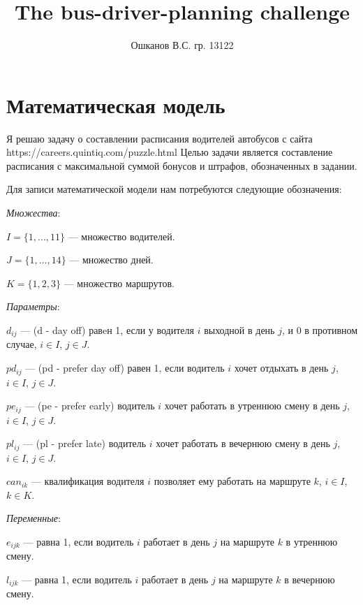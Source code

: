 \documentclass[]{article}
\title{The bus-driver-planning challenge}
\author{Ошканов В.С. гр. 13122}
\begin{document}
\maketitle
\section{Математическая модель}

Я решаю задачу о составлении расписания водителей автобусов с
сайта https://careers.quintiq.com/puzzle.html
Целью задачи является составление расписания с максимальной
суммой бонусов и штрафов, обозначенных в задании.

Для записи математической модели нам потребуются следующие обозначения:
\par
\textit{Множества}:
\par\noindent
$I = \{1,...,11\}$ --- множество водителей.
\par\noindent
$J = \{1,...,14\}$ --- множество дней.
\par\noindent
$K = \{1,2,3\}$ --- множество маршрутов.
\par
\textit{Параметры}:
\par\noindent
$d_{ij}$ --- (d - day off) равeн 1, если у водителя $i$ выходной в день $j$, и 0
в противном случае, $i\in I$, $j\in J$.
\par\noindent
$pd_{ij}$ --- (pd - prefer day off) равен 1, если водитель $i$ хочет отдыхать в
день $j$, $i\in I$, $j\in J$.
\par\noindent
$pe_{ij}$ --- (pe - prefer early) водитель $i$ хочет работать в утреннюю
смену в день $j$, $i\in I$, $j\in J$.
\par\noindent
$pl_{ij}$ --- (pl - prefer late) водитель $i$ хочет работать в вечернюю
смену в день $j$, $i\in I$, $j\in J$.
\par\noindent
$can_{ik}$ --- квалификация водителя $i$ позволяет ему работать на маршруте $k$,
 $i\in I$, $k\in K$.
\par
\textit{Переменные}:
\par\noindent
$e_{ijk}$ --- равна 1, если водитель $i$ работает в день $j$ на маршруте $k$
в утреннюю смену.
\par\noindent
$l_{ijk}$ --- равна 1, если водитель $i$ работает в день $j$ на маршруте $k$
в вечернюю смену.
\end{document}
